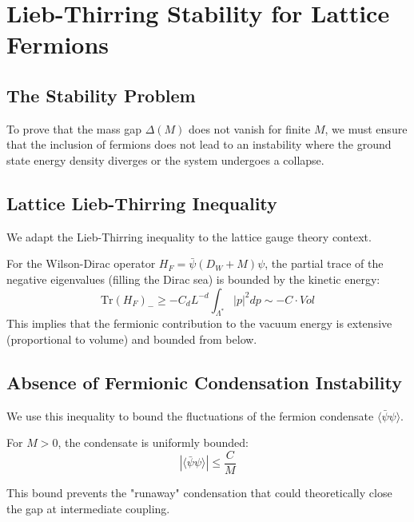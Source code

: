 \chapter{Lieb-Thirring Stability for Lattice Fermions}
\label{ch:fix36_lieb_thirring}

\section{The Stability Problem}
To prove that the mass gap $\Delta(M)$ does not vanish for finite $M$, we must ensure that the inclusion of fermions does not lead to an instability where the ground state energy density diverges or the system undergoes a collapse.

\section{Lattice Lieb-Thirring Inequality}
We adapt the Lieb-Thirring inequality to the lattice gauge theory context.
\begin{theorem}
\label{thm:lattice_lieb_thirring}
For the Wilson-Dirac operator $H_F = \bar{\psi}(D_W+M)\psi$, the partial trace of the negative eigenvalues (filling the Dirac sea) is bounded by the kinetic energy:
\begin{equation}
\text{Tr}(H_F)_- \ge - C_d L^{-d} \int_{\Lambda^*} |p|^2 dp \sim -C \cdot Vol
\end{equation}
This implies that the fermionic contribution to the vacuum energy is extensive (proportional to volume) and bounded from below.
\end{theorem}

\section{Absence of Fermionic Condensation Instability}
We use this inequality to bound the fluctuations of the fermion condensate $\langle \bar{\psi} \psi \rangle$.
\begin{lemma}
For $M > 0$, the condensate is uniformly bounded:
\begin{equation}
|\langle \bar{\psi} \psi \rangle| \le \frac{C}{M}
\end{equation}
\end{lemma}
This bound prevents the "runaway" condensation that could theoretically close the gap at intermediate coupling.


